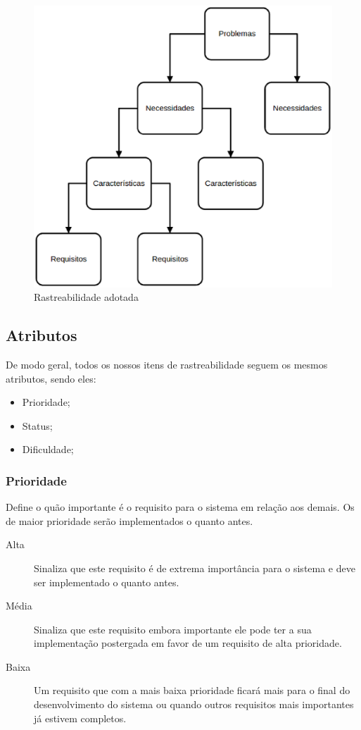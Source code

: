 \begin{figure}[htb]
	\centering
	\label{rastreabilidade2}
		\includegraphics[keepaspectratio=true,scale=0.6]{figuras/rastreabilidade2.eps}
	\caption{Rastreabilidade adotada}
\end{figure}

\clearpage{}

\subsection{Atributos}

De modo geral, todos os nossos itens de rastreabilidade seguem os mesmos atributos, sendo eles:

\begin{itemize}
\item Prioridade;
\item Status;
\item Dificuldade;
\end{itemize}

\subsubsection{Prioridade}

Define o quão importante é o requisito para o sistema em relação aos demais. Os de maior prioridade serão implementados o quanto antes.

\begin{description}
\item [Alta] Sinaliza que este requisito é de extrema importância para o sistema e deve ser implementado o quanto antes.
\item [Média] Sinaliza que este requisito embora importante ele pode ter a sua implementação postergada em favor de um requisito de alta prioridade.
\item [Baixa] Um requisito que com a mais baixa prioridade ficará mais para o final do desenvolvimento do sistema ou quando outros requisitos mais importantes já estivem completos.
\end{description}

